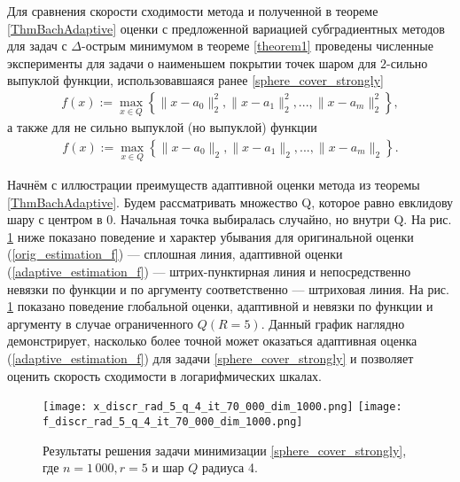 Для сравнения скорости сходимости метода \cite{Bach_2012} и полученной в теореме \ref{ThmBachAdaptive} оценки с предложенной вариацией субградиентных методов для задач с $\Delta$-острым минимумом в теореме \ref{theorem1} проведены численные эксперименты для задачи о наименьшем покрытии точек шаром для $2$-сильно выпуклой функции, использовавшаяся ранее \eqref{sphere_cover_strongly}
\begin{gather}
    f(x) := \max_{x\in Q}\left\{\|x - a_0\|_2^2, \|x - a_1\|_2^2, ..., \|x - a_m\|_2^2\right\},
\end{gather}
а также для не сильно выпуклой (но выпуклой) функции
\begin{gather}\label{sphere_cover}
    f(x) := \max_{x\in Q}\left\{\|x - a_0\|_2, \|x - a_1\|_2, ..., \|x - a_m\|_2\right\}.
\end{gather}

Начнём с иллюстрации преимуществ адаптивной оценки метода \cite{Bach_2012} из теоремы \ref{ThmBachAdaptive}. Будем рассматривать множество Q, которое равно евклидову шару с центром в 0. Начальная точка выбиралась случайно, но внутри Q. На рис. \ref{res_ex_strong_r5} ниже показано поведение и характер убывания для оригинальной оценки (\ref{orig_estimation_f}) --- сплошная линия, адаптивной оценки (\ref{adaptive_estimation_f}) --- штрих-пунктирная линия и непосредственно невязки по функции и по аргументу соответственно --- штриховая линия. На рис. \ref{res_ex_strong_r5} показано поведение глобальной оценки, адаптивной и невязки по функции и аргументу в случае ограниченного $Q (R = 5)$. Данный график наглядно демонстрирует, насколько более точной может оказаться адаптивная оценка (\ref{adaptive_estimation_f}) для задачи \eqref{sphere_cover_strongly} и позволяет оценить скорость сходимости в логарифмических шкалах.

\begin{figure}[h]
    \texttt{[image: x\_discr\_rad\_5\_q\_4\_it\_70\_000\_dim\_1000.png]}
    \endminipage\hfill
    \texttt{[image: f\_discr\_rad\_5\_q\_4\_it\_70\_000\_dim\_1000.png]}
    \endminipage\hfill
    \caption{Результаты решения задачи минимизации \eqref{sphere_cover_strongly}, где  $n= 1\,000, r = 5$ и  шар $Q$ радиуса 4.}
    \label{res_ex_strong_r5}
\end{figure}

